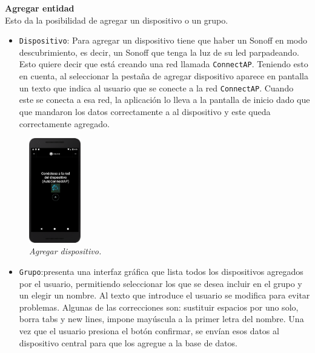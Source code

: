 \textbf{Agregar entidad}\\
Esto da la posibilidad de agregar un dispositivo o un grupo.\\
\begin{itemize}
  \item \lstinline[columns=fixed]{Dispositivo}: Para agregar un dispositivo tiene que haber un Sonoff en modo descubrimiento, es decir, un Sonoff que tenga la luz de su led parpadeando. Esto quiere decir que está creando una red llamada \lstinline[columns=fixed]{ConnectAP}. Teniendo esto en cuenta, al seleccionar la pestaña de agregar dispositivo  aparece en pantalla un texto que indica al usuario que se conecte a la red \lstinline[columns=fixed]{ConnectAP}. Cuando este se conecta a esa red, la aplicación lo lleva a la pantalla de inicio dado que que mandaron los datos correctamente a al dispositivo y este queda correctamente agregado.~
\end{itemize}

\begin{figure}[H]
  \centering
  \includegraphics[width=0.2\textwidth, keepaspectratio]{images/app-movil-add-device}
  \caption{\textit{Agregar dispositivo.}}
  \label{fig:app-movil-add-device}
\end{figure}

 \begin{itemize}
  \item \lstinline[columns=fixed]{Grupo}:presenta una interfaz gráfica que lista todos los dispositivos agregados por el usuario, permitiendo seleccionar los que se desea incluir en el grupo y un elegir un nombre. Al texto que introduce el usuario se modifica para evitar problemas. Algunas de las correcciones son: sustituir espacios por uno solo, borra tabs y new lines, impone mayúscula a la primer letra del nombre. Una vez que el usuario presiona el botón confirmar, se envían esos datos al dispositivo central para que los agregue a la base de datos.~
\end{itemize}


